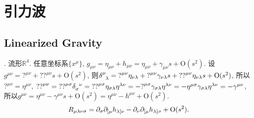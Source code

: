 \chapter{引力波}\label{GW}

\section{Linearized Gravity}\label{Linearized_Gravity}

\cite{Wald1984,Hughes2009,Maggiore2014}. 流形$\mathbb{R}^{4}$. 任意坐标系$\{x^{\mu}\}$, $g_{\mu\nu}=\eta_{\mu\nu}+h_{\mu\nu}=\eta_{\mu\nu}+\gamma_{\mu\nu}s+\text{O}(s^2)$. 设$g^{\mu\nu}={?}^{\mu\nu}+{??}^{\mu\nu}s+\text{O}(s^2)$, 则$\delta^{\mu}_{\ph{\mu}\lambda}={?}^{\mu\nu}\eta_{\nu\lambda}+{?}^{\mu\nu}\gamma_{\nu\lambda}s+{??}^{\mu\nu}\eta_{\nu\lambda}s+\text{O}(s^2)$, 所以${?}^{\mu\nu}=\eta^{\mu\nu}$, ${??}^{\mu\nu}={??}^{\mu\sigma}\delta_{\sigma}^{\ph{\sigma}\nu}={??}^{\mu\sigma}\eta_{\sigma\lambda}\eta^{\lambda\nu}=-{?}^{\mu\sigma}\gamma_{\sigma\lambda}\eta^{\lambda\nu}=-\eta^{\mu\sigma}\gamma_{\sigma\lambda}\eta^{\lambda\nu}=-\gamma^{\mu\nu}$, 所以$g^{\mu\nu}=\eta^{\mu\nu}-\gamma^{\mu\nu}s+\text{O}(s^2)=\eta^{\mu\nu}-h^{\mu\nu}+\text{O}(s^2)$.
\begin{equation}
    R_{\mu\lambda\nu\sigma}=\partial_\sigma\partial_{[\mu}h_{\lambda]\nu}-\partial_\nu\partial_{[\mu}h_{\lambda]\sigma}+\text{O}(s^2).
\end{equation}

